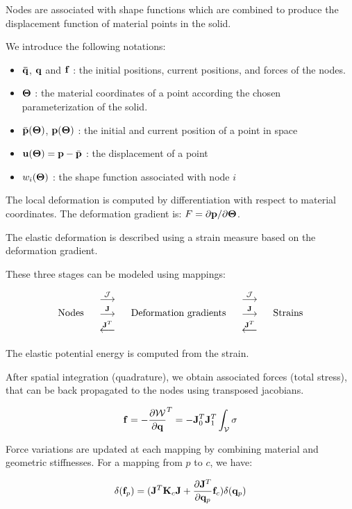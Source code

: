 Nodes are associated with shape functions which are combined to produce the displacement function of material points in the solid.

We introduce the following notations:
\begin{itemize}
 \item $\mathbf{{\bar{q}}}$, $\mathbf{{q}}$ and $\mathbf{{f}}$ : the initial positions, current positions, and forces of the nodes.
 \item $\mathbf{{\Theta}}$ : the material coordinates of a point according the chosen parameterization of the solid.
 \item $\bar{\mathbf{{p}}}(\mathbf{{\Theta}})$, $\mathbf{{p}} (\mathbf{{\Theta}})$ : the initial and current position of a point in space
 \item $\mathbf{{u}} (\mathbf{{\Theta}}) =\mathbf{{p}}-\bar{\mathbf{{p}}}$ : the displacement of a point
 \item $w_i(\mathbf{{\Theta}})$ : the shape function associated with node $i$
\end{itemize}

The local deformation is computed by differentiation with respect to material coordinates. The deformation gradient is: $F = \partial \mathbf{{p}} / \partial \mathbf{{\Theta}}$.

The elastic deformation is described using a strain measure based on the deformation gradient. 

These three stages can be modeled using \sofa{} mappings:

\begin{equation}
\left. \begin{array}{ccccc}
\mbox{Nodes}  & \left. \begin{array}{c} \stackrel{\mathbf{\mathcal{J}}}{\longrightarrow} \\ \stackrel{\mathbf{{J}}}{\longrightarrow} \\ \stackrel{\mathbf{{J}}^T}{\longleftarrow} \end{array}\right. &   \mbox{Deformation gradients} & \left. \begin{array}{c} \stackrel{\mathbf{\mathcal{J}}}{\longrightarrow} \\ \stackrel{\mathbf{{J}}}{\longrightarrow} \\ \stackrel{\mathbf{{J}}^T}{\longleftarrow} \end{array}\right. &  \mbox{Strains}
\end{array}\right. 
\end{equation}

The elastic potential energy is computed from the strain. 

After spatial integration (quadrature), we obtain associated forces (total stress), that can be back propagated to the nodes using transposed jacobians.

\begin{equation}\label{eq:f}
 \mathbf{{\mathbf{{f}}}} = - \frac{\partial \mathcal{W}}{\partial \mathbf{{q}}}^T =  - \mathbf{{J}}^T_0\mathbf{{J}}^T_1 \int_{\mathcal{V}} \sigma
\end{equation}

Force variations are updated at each mapping by combining material and geometric stiffnesses. For a mapping from $p$ to $c$, we have:

\begin{equation}
 \delta(\mathbf{{\mathbf{{f}}}}_p) = ( \mathbf{{J}}^T \mathbf{{K}}_c \mathbf{{J}} + \frac{\partial \mathbf{{J}}^T}{\partial \mathbf{{q}}_p} \mathbf{{\mathbf{{f}}}}_c ) \delta(\mathbf{{q}}_p) 
\end{equation}

